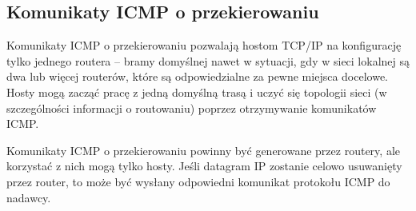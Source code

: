 \documentclass[../main.tex]{subfiles}
\begin{document}
    \subsection{Komunikaty ICMP o przekierowaniu}
    Komunikaty ICMP o przekierowaniu pozwalają hostom TCP/IP na konfigurację tylko jednego
    routera – bramy domyślnej nawet w sytuacji, gdy w sieci lokalnej są dwa lub więcej
    routerów, które są odpowiedzialne za pewne miejsca docelowe.
    Hosty mogą zacząć pracę z jedną domyślną trasą i uczyć się topologii sieci (w szczególności
    informacji o routowaniu) poprzez otrzymywanie komunikatów ICMP.

    Komunikaty ICMP o przekierowaniu powinny być generowane przez routery, ale korzystać z
    nich mogą tylko hosty.
    Jeśli datagram IP zostanie celowo usuwanięty przez router, to może być wysłany odpowiedni komunikat protokołu ICMP do nadawcy.
\end{document}
